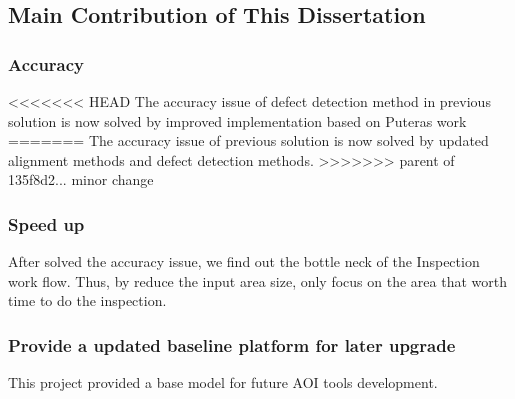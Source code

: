 	\subsection{Main Contribution of This Dissertation}
	\label{subsec:advantages}
		\subsubsection{Accuracy}
<<<<<<< HEAD
			The accuracy issue of defect detection method in previous solution is now solved by improved implementation based on Puteras work 
=======
			The accuracy issue of previous solution is now solved by updated alignment methods and defect detection methods.
>>>>>>> parent of 135f8d2... minor change

		\subsubsection{Speed up}
			After solved the accuracy issue, we find out the bottle neck of the Inspection work flow. Thus, by reduce the input area size, only focus on the area that worth time to do the inspection.

		\subsubsection{Provide a updated baseline platform for later upgrade}
			This project provided a base model for future AOI tools development.
